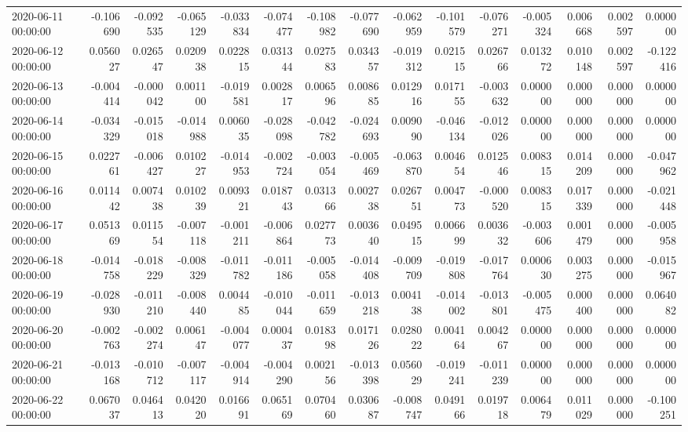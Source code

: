 \begin{tabular}{lrrrrrrrrrrrrrr}
2020-06-11 00:00:00 & -0.106690 & -0.092535 & -0.065129 & -0.033834 & -0.074477 & -0.108982 & -0.077690 & -0.062959 & -0.101579 & -0.076271 & -0.005324 & 0.006668 & 0.002597 & 0.000000 \\
2020-06-12 00:00:00 & 0.056027 & 0.026547 & 0.020938 & 0.022815 & 0.031344 & 0.027583 & 0.034357 & -0.019312 & 0.021515 & 0.026766 & 0.013272 & 0.010148 & 0.002597 & -0.122416 \\
2020-06-13 00:00:00 & -0.004414 & -0.000042 & 0.001100 & -0.019581 & 0.002817 & 0.006596 & 0.008685 & 0.012916 & 0.017155 & -0.003632 & 0.000000 & 0.000000 & 0.000000 & 0.000000 \\
2020-06-14 00:00:00 & -0.034329 & -0.015018 & -0.014988 & 0.006035 & -0.028098 & -0.042782 & -0.024693 & 0.009090 & -0.046134 & -0.012026 & 0.000000 & 0.000000 & 0.000000 & 0.000000 \\
2020-06-15 00:00:00 & 0.022761 & -0.006427 & 0.010227 & -0.014953 & -0.002724 & -0.003054 & -0.005469 & -0.063870 & 0.004654 & 0.012546 & 0.008315 & 0.014209 & 0.000000 & -0.047962 \\
2020-06-16 00:00:00 & 0.011442 & 0.007438 & 0.010239 & 0.009321 & 0.018743 & 0.031366 & 0.002738 & 0.026751 & 0.004773 & -0.000520 & 0.008315 & 0.017339 & 0.000000 & -0.021448 \\
2020-06-17 00:00:00 & 0.051369 & 0.011554 & -0.007118 & -0.001211 & -0.006864 & 0.027773 & 0.003640 & 0.049515 & 0.006699 & 0.003632 & -0.003606 & 0.001479 & 0.000000 & -0.005958 \\
2020-06-18 00:00:00 & -0.014758 & -0.018229 & -0.008329 & -0.011782 & -0.011186 & -0.005058 & -0.014408 & -0.009709 & -0.019808 & -0.017764 & 0.000630 & 0.003275 & 0.000000 & -0.015967 \\
2020-06-19 00:00:00 & -0.028930 & -0.011210 & -0.008440 & 0.004485 & -0.010044 & -0.011659 & -0.013218 & 0.004138 & -0.014002 & -0.013801 & -0.005475 & 0.000400 & 0.000000 & 0.064082 \\
2020-06-20 00:00:00 & -0.002763 & -0.002274 & 0.006147 & -0.004077 & 0.000437 & 0.018398 & 0.017126 & 0.028022 & 0.004164 & 0.004267 & 0.000000 & 0.000000 & 0.000000 & 0.000000 \\
2020-06-21 00:00:00 & -0.013168 & -0.010712 & -0.007117 & -0.004914 & -0.004290 & 0.002156 & -0.013398 & 0.056029 & -0.019241 & -0.011239 & 0.000000 & 0.000000 & 0.000000 & 0.000000 \\
2020-06-22 00:00:00 & 0.067037 & 0.046413 & 0.042020 & 0.016691 & 0.065169 & 0.070460 & 0.030687 & -0.008747 & 0.049166 & 0.019718 & 0.006479 & 0.011029 & 0.000000 & -0.100251 \\

\end{tabular}
